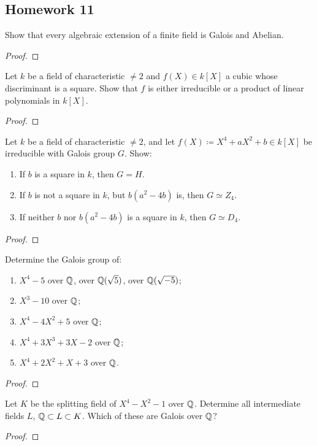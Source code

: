 \subsection{Homework 11}
\begin{problem}
Show that every algebraic extension of a finite field is Galois and
Abelian.
\end{problem}
\begin{proof}
\end{proof}

\begin{problem}
Let $k$ be a field of characteristic $\neq 2$ and $f(X)\in k[X]$ a cubic
whose discriminant is a square. Show that $f$ is either irreducible or a
product of linear polynomials in $k[X]$.
\end{problem}
\begin{proof}
\end{proof}

\begin{problem}
Let $k$ be a field of characteristic $\neq 2$, and let $f(X)\coloneqq
X^4+aX^2+b\in k[X]$ be irreducible with Galois group $G$. Show:
\begin{enumerate}[label=(\roman*),noitemsep]
\item If $b$ is a square in $k$, then $G=H$.
\item If $b$ is not a square in $k$, but $b(a^2-4b)$ is, then $G\simeq
  Z_4$.
\item If neither $b$ nor $b(a^2-4b)$ is a square in $k$, then $G\simeq
  D_4$.
\end{enumerate}
\end{problem}
\begin{proof}
\end{proof}

\begin{problem}
Determine the Galois group of:
\begin{enumerate}[label=(\alph*),noitemsep]
\item $X^4-5$ over $\mathbb{Q}$, over $\mathbb{Q}(\sqrt{5})$, over $\mathbb{Q}(\sqrt{-5})$;
\item $X^3-10$ over $\mathbb{Q}$;
\item $X^4-4X^2+5$ over $\mathbb{Q}$;
\item $X^4+3X^3+3X-2$ over $\mathbb{Q}$;
\item $X^4+2X^2+X+3$ over $\mathbb{Q}$.
\end{enumerate}
\end{problem}
\begin{proof}
\end{proof}

\begin{problem}
Let $K$ be the splitting field of $X^4-X^2-1$ over $\mathbb{Q}$. Determine all
intermediate fields $L$, $\mathbb{Q}\subset L\subset K$. Which of these are
Galois over $\mathbb{Q}$?
\end{problem}
\begin{proof}
\end{proof}

